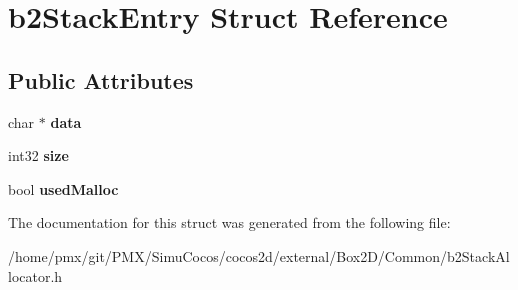 \hypertarget{structb2StackEntry}{}\section{b2\+Stack\+Entry Struct Reference}
\label{structb2StackEntry}
\subsection*{Public Attributes}
\begin{DoxyCompactItemize}
\item 
\mbox{\label{structb2StackEntry_a1f791d029c4c0d64bc8b17558313be27}} 
char $\ast$ {\bfseries data}
\item 
\mbox{\label{structb2StackEntry_a910c62f05317f8906224b2569e0cb344}} 
int32 {\bfseries size}
\item 
\mbox{\label{structb2StackEntry_a581b5e4699bb66a28ec0727497a4e478}} 
bool {\bfseries used\+Malloc}
\end{DoxyCompactItemize}


The documentation for this struct was generated from the following file\+:\begin{DoxyCompactItemize}
\item 
/home/pmx/git/\+P\+M\+X/\+Simu\+Cocos/cocos2d/external/\+Box2\+D/\+Common/b2\+Stack\+Allocator.\+h\end{DoxyCompactItemize}
